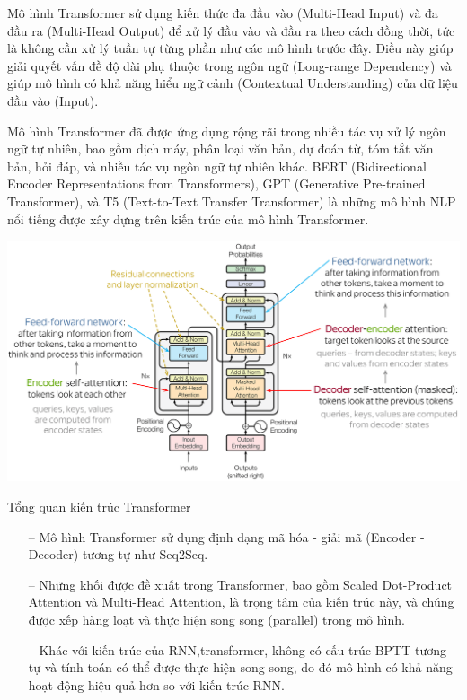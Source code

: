 \documentclass[a4paper, 12pt, openany]{book}
\begin{document}
Mô hình Transformer sử dụng kiến thức đa đầu vào (Multi-Head Input) và đa đầu
ra (Multi-Head Output) để xử lý đầu vào và đầu ra theo cách đồng thời, tức là không cần
xử lý tuần tự từng phần như các mô hình trước đây. Điều này giúp giải quyết vấn đề độ
dài phụ thuộc trong ngôn ngữ (Long-range Dependency) và giúp mô hình có khả năng
hiểu ngữ cảnh (Contextual Understanding) của dữ liệu đầu vào (Input).

Mô hình Transformer đã được ứng dụng rộng rãi trong nhiều tác vụ xử lý ngôn ngữ
tự nhiên, bao gồm dịch máy, phân loại văn bản, dự đoán từ, tóm tắt văn bản, hỏi đáp, và
nhiều tác vụ ngôn ngữ tự nhiên khác. BERT\cite{BERT} (Bidirectional Encoder Representations from
Transformers), GPT\cite{yenduri2023generative} (Generative Pre-trained Transformer), và T5\cite{raffel2023exploring} (Text-to-Text Transfer
Transformer) là những mô hình NLP nổi tiếng được xây dựng trên kiến trúc của mô hình
Transformer.

\begin{minipage}{\linewidth}
    \captionsetup{type=figure}
    \centering
    \includegraphics[width=\linewidth]{./assets/images/transformer.png}
    \caption{Tổng quan kiến trúc Transformer\cite{vaswani2023attention}}
\end{minipage}

\begin{itemize}
    \item[--]  Mô hình Transformer sử dụng định dạng mã hóa - giải mã (Encoder - Decoder)
        tương tự như Seq2Seq.
    \item[--]  Những khối được đề xuất trong Transformer, bao gồm Scaled Dot-Product
        Attention và Multi-Head Attention, là trọng tâm của kiến trúc này, và chúng
        được xếp hàng loạt và thực hiện song song (parallel) trong mô hình.
    \item[--] Khác với kiến trúc của RNN,transformer, không có cấu trúc BPTT tương tự và tính toán
        có thể được thực hiện song song, do đó mô hình có khả năng hoạt động hiệu quả
        hơn so với kiến trúc RNN.
\end{itemize}
\end{document}
